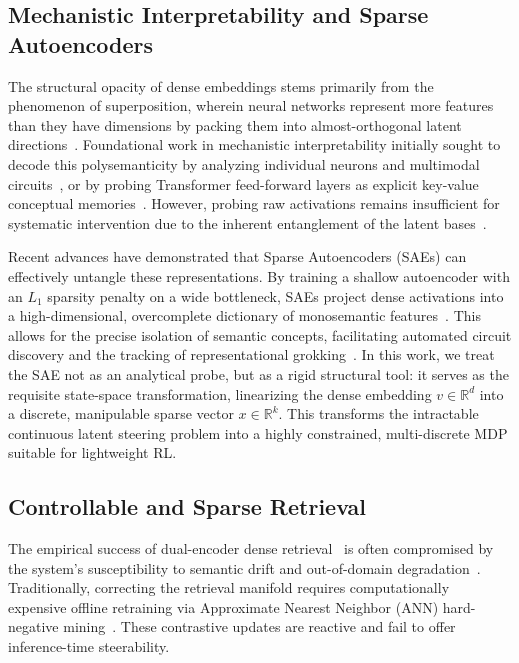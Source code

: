 \subsection{Mechanistic Interpretability and Sparse Autoencoders}
The structural opacity of dense embeddings stems primarily from the phenomenon of superposition, wherein neural networks represent more features than they have dimensions by packing them into almost-orthogonal latent directions~\citep{elhage2022}. Foundational work in mechanistic interpretability initially sought to decode this polysemanticity by analyzing individual neurons and multimodal circuits~\citep{olah2020, goh2021}, or by probing Transformer feed-forward layers as explicit key-value conceptual memories~\citep{yun2020, geva2022, meng2022}. However, probing raw activations remains insufficient for systematic intervention due to the inherent entanglement of the latent bases~\citep{lee2023, arora2018}.

Recent advances have demonstrated that Sparse Autoencoders (SAEs) can effectively untangle these representations. By training a shallow autoencoder with an $L_1$ sparsity penalty on a wide bottleneck, SAEs project dense activations into a high-dimensional, overcomplete dictionary of monosemantic features~\citep{cunningham2024, bricken2023, templeton2024, gao2024scaling}. This allows for the precise isolation of semantic concepts, facilitating automated circuit discovery and the tracking of representational grokking~\citep{conmy2023, nanda2023, wang2023}. In this work, we treat the SAE not as an analytical probe, but as a rigid structural tool: it serves as the requisite state-space transformation, linearizing the dense embedding $v \in \mathbb{R}^d$ into a discrete, manipulable sparse vector $x \in \mathbb{R}^k$. This transforms the intractable continuous latent steering problem into a highly constrained, multi-discrete MDP suitable for lightweight RL.

\subsection{Controllable and Sparse Retrieval}
The empirical success of dual-encoder dense retrieval~\citep{karpukhin2020, izacard2022} is often compromised by the system's susceptibility to semantic drift and out-of-domain degradation~\citep{zhan2021}. Traditionally, correcting the retrieval manifold requires computationally expensive offline retraining via Approximate Nearest Neighbor (ANN) hard-negative mining~\citep{qu2021, hofstatter2021, xiong2021}. These contrastive updates are reactive and fail to offer inference-time steerability.

